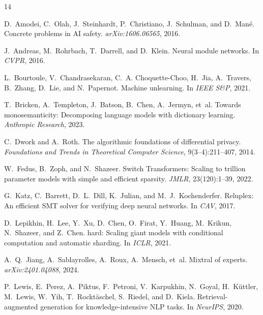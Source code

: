 \documentclass[11pt,a4paper]{article}
\begin{document}
\begin{thebibliography}{14}

D.~Amodei, C.~Olah, J.~Steinhardt, P.~Christiano, J.~Schulman, and D.~Man\'{e}.
\newblock Concrete problems in {AI} safety.
\newblock \emph{arXiv:1606.06565}, 2016.

J.~Andreas, M.~Rohrbach, T.~Darrell, and D.~Klein.
\newblock Neural module networks.
\newblock In \emph{CVPR}, 2016.

L.~Bourtoule, V.~Chandrasekaran, C.~A. Choquette-Choo, H.~Jia, A.~Travers, B.~Zhang, D.~Lie, and N.~Papernot.
\newblock Machine unlearning.
\newblock In \emph{IEEE S\&P}, 2021.

T.~Bricken, A.~Templeton, J.~Batson, B.~Chen, A.~Jermyn, et~al.
\newblock Towards monosemanticity: Decomposing language models with dictionary learning.
\newblock \emph{Anthropic Research}, 2023.

C.~Dwork and A.~Roth.
\newblock The algorithmic foundations of differential privacy.
\newblock \emph{Foundations and Trends in Theoretical Computer Science}, 9(3--4):211--407, 2014.

W.~Fedus, B.~Zoph, and N.~Shazeer.
\newblock Switch {T}ransformers: Scaling to trillion parameter models with simple and efficient sparsity.
\newblock \emph{JMLR}, 23(120):1--39, 2022.

G.~Katz, C.~Barrett, D.~L.~Dill, K.~Julian, and M.~J.~Kochenderfer.
\newblock Reluplex: An efficient {SMT} solver for verifying deep neural networks.
\newblock In \emph{CAV}, 2017.

D.~Lepikhin, H.~Lee, Y.~Xu, D.~Chen, O.~Firat, Y.~Huang, M.~Krikun, N.~Shazeer, and Z.~Chen.
hard: Scaling giant models with conditional computation and automatic sharding.
\newblock In \emph{ICLR}, 2021.

A.~Q.~Jiang, A.~Sablayrolles, A.~Roux, A.~Mensch, et~al.
\newblock Mixtral of experts.
\newblock \emph{arXiv:2401.04088}, 2024.

P.~Lewis, E.~Perez, A.~Piktus, F.~Petroni, V.~Karpukhin, N.~Goyal, H.~K\"{u}ttler, M.~Lewis, W.~Yih, T.~Rockt\"{a}schel, S.~Riedel, and D.~Kiela.
\newblock Retrieval-augmented generation for knowledge-intensive {NLP} tasks.
\newblock In \emph{NeurIPS}, 2020.


\end{thebibliography}
\end{document}

